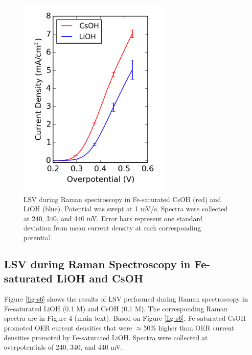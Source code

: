 \documentclass[journal=jpccck,manuscript=suppinfo,email=true]{achemso}
\begin{document}
\begin{figure}[h]
\centering
\includegraphics[width=3in]{./images/figures-supp-info/IvsV-Raman-Li-Cs-pure-10-31.png}
\caption{\label{fig-s5}LSV during Raman spectroscopy in Fe-saturated CsOH (red) and LiOH (blue). Potential was swept at 1 mV/s. Spectra were collected at 240, 340, and 440 mV. Error bars represent one standard deviation from mean current density at each corresponding potential.}
\end{figure}

\subsection{LSV during Raman Spectroscopy in Fe-saturated LiOH and CsOH}
\label{sec-2-6}
Figure \ref{fig-s6} shows the results of LSV performed during Raman spectroscopy in Fe-saturated LiOH (0.1 M) and CsOH (0.1 M). The corresponding Raman spectra are in Figure 4 (main text). Based on Figure \ref{fig-s6}, Fe-saturated CsOH promoted OER current densities that were $\approx$50\% higher than OER current densities promoted by Fe-saturated LiOH. Spectra were collected at overpotentials of 240, 340, and 440 mV.
\end{document}
